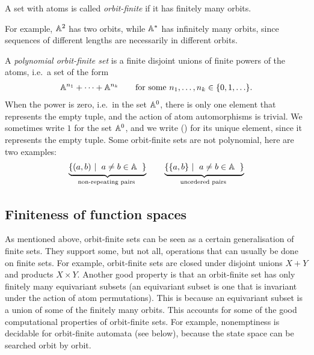 \begin{definition}   A set with atoms is called \emph{orbit-finite} if it has finitely many orbits. 
\end{definition}

For example,  $\mathbb A^2$ has two orbits, while   $\mathbb A^*$ has infinitely many orbits, since sequences of different lengths are necessarily in different orbits. 

\begin{example}\label{ex:polynomial-orbit-finite-sets} 
  A \emph{polynomial orbit-finite set} is a finite disjoint unions of finite powers of the atoms, i.e.~a set of the form 
    \begin{align*}
    \mathbb A^{n_1} + \cdots + \mathbb A^{n_k} \qquad \text{for some }n_1,\ldots,n_k \in \{0,1,\ldots\}.
    \end{align*}
    When the power is zero, i.e.~in the set $\mathbb A^0$, there is only one element  that represents the empty tuple, and the action of atom automorphisms is trivial. We sometimes write $1$ for the set $\mathbb A^0$, and we write () for its unique element, since it represents the empty tuple. Some orbit-finite sets are not polynomial, here are two examples:
    \begin{align*}
    \myunderbrace{
        \setbuild{(a,b)}{$a \neq b \in \atoms$}
    }{ non-repeating pairs}
    \qquad 
    \myunderbrace{
    \setbuild{\set{a,b}}{$a \neq b \in \atoms$}
    }{ unordered pairs} 
    \end{align*}  
        
\end{example}

\subsection{Finiteness of function spaces}
As mentioned above, orbit-finite sets can be seen as  a certain generalisation of finite sets. They support some, but not all, operations that can usually be done on finite sets. For example, orbit-finite sets are closed under disjoint unions $X + Y$ and products $X \times Y$.  Another good property is that an orbit-finite set has only finitely many equivariant subsets (an equivariant subset is one that is invariant under the action of atom permutations). This is because an equivariant subset is a union of some of the finitely many orbits. This accounts for some of the good computational properties of orbit-finite sets. For example, nonemptiness is decidable for orbit-finite automata (see below), because the state space can be searched orbit by orbit.

